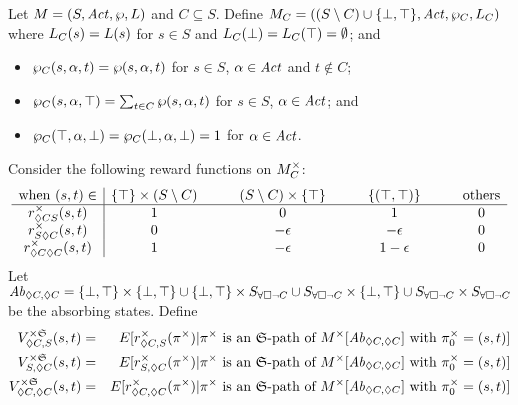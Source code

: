 Let $M = (S, \mathit{Act}, \wp, L)$ and $C \subseteq S$. Define ${M}_{C} =
((S \setminus C) \cup \{ \bot, \top \}, \mathit{Act}, {\wp}_{C}, {L}_{C})$ where
${L}_{C} (s) = L (s)$ for $s \in S$ and ${L}_{C} (\bot) =
{L}_{C} (\top) = \emptyset$; and
\begin{itemize}
\item ${\wp}_{C} (s, \alpha, t) = \wp (s, \alpha, t)$ for $s \in
  S$, $\alpha \in \mathit{Act}$ and $t \not\in C$;
\item ${\wp}_{C} (s, \alpha, \top) = \sum_{t \in C} \wp (s,
  \alpha, t)$ for $s \in S$, $\alpha \in \mathit{Act}$; and
\item ${\wp}_{C} (\top, \alpha, \bot) = {\wp}_{C} (\bot,
  \alpha, \bot) = 1$ for $\alpha \in \mathit{Act}$.
\end{itemize}

Consider the following reward functions on ${M}_{C}^{\times}$:
\[
\begin{array}{c|cccccccc}
  \textmd{when } (s, t) \in 
  & \{ \top \} \times (S \setminus C)
  & \hspace{1em}
  & (S \setminus C) \times \{ \top \}
  & \hspace{1em}
  & \{ (\top, \top) \}
  & \hspace{1em}
  & \textmd{others}\\
  \hline
  {r}_{{\lozenge C}S}^{\times} (s, t) & 1 && 0 && 1 && 0\\
  {r}_{S{\lozenge C}}^{\times} (s, t) & 0 && -\epsilon && -\epsilon && 0\\
  {r}_{{\lozenge C}{\lozenge C}}^{\times} (s, t) & 1 && -\epsilon && 1-\epsilon && 0\\
\end{array}
\]
Let $\mathit{Ab}_{\lozenge C, \lozenge C} = \{ \bot, \top \} \times \{ \bot,
\top \} \cup \{ \bot, \top \} \times S_{\forall\square \neg C} \cup S_{\forall\square \neg C} \times \{
\bot, \top \} \cup S_{\forall\square \neg C} \times S_{\forall\square \neg C}$ be the absorbing states.
Define
\begin{eqnarray*}
  {V}_{\lozenge C, S}^{\times \mathfrak{S}} (s, t) & = &
  E[ {r}_{\lozenge C, S}^{\times} (\pi^{\times}) | \pi^{\times} \textmd{ is an
  $\mathfrak{S}$-path of } M^{\times}[\mathit{Ab}_{\lozenge C, \lozenge C}]
  \textmd{ with } \pi_0^{\times} = (s, t) ]\\
  {V}_{S, \lozenge C}^{\times \mathfrak{S}} (s, t) & = &
  E[ {r}_{S, \lozenge C}^{\times} (\pi^{\times}) | \pi^{\times} \textmd{ is an
  $\mathfrak{S}$-path of } M^{\times}[\mathit{Ab}_{\lozenge C, \lozenge C}] 
  \textmd{ with } \pi_0^{\times} = (s, t) ]\\
  {V}_{\lozenge C, \lozenge C}^{\times \mathfrak{S}} (s, t) & = &
  E[ {r}_{\lozenge C, \lozenge C}^{\times} (\pi^{\times}) | \pi^{\times} \textmd{ is an
  $\mathfrak{S}$-path of } M^{\times}[\mathit{Ab}_{\lozenge C, \lozenge C}] 
  \textmd{ with } \pi_0^{\times} = (s, t) ]
\end{eqnarray*}

